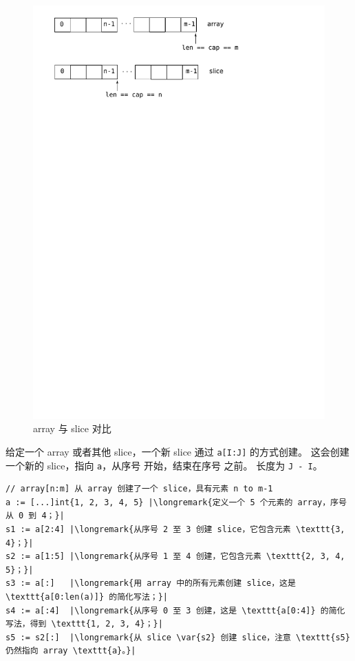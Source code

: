 \begin{figure}[H]
\caption{array 与 slice 对比}
\label{fig:array-vs-slice}
\begin{center}
\includegraphics[scale=0.65]{fig/array-vs-slice.pdf}
\end{center}
\end{figure}

给定一个 array 或者其他 slice，一个新 slice 通过 \lstinline{a[I:J]}
的方式创建。
这会创建一个新的 slice，指向 \lstinline{a}，从序号  开始，结束在序号 之前。
长度为 \lstinline{J - I}。

\begin{lstlisting}
// array[n:m] 从 array 创建了一个 slice，具有元素 n to m-1
a := [...]int{1, 2, 3, 4, 5} |\longremark{定义一个 5 个元素的 array，序号从 0 到 4；}|
s1 := a[2:4] |\longremark{从序号 2 至 3 创建 slice，它包含元素 \texttt{3, 4}；}|
s2 := a[1:5] |\longremark{从序号 1 至 4 创建，它包含元素 \texttt{2, 3, 4, 5}；}|
s3 := a[:]   |\longremark{用 array 中的所有元素创建 slice，这是 \texttt{a[0:len(a)]} 的简化写法；}|
s4 := a[:4]  |\longremark{从序号 0 至 3 创建，这是 \texttt{a[0:4]} 的简化写法，得到 \texttt{1, 2, 3, 4}；}|
s5 := s2[:]  |\longremark{从 slice \var{s2} 创建 slice，注意 \texttt{s5} 仍然指向 array \texttt{a}。}|
\end{lstlisting}
\showremarks

